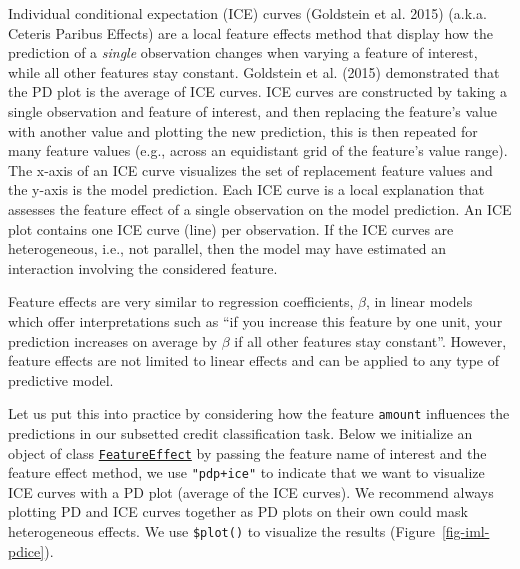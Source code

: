 Individual conditional
expectation (ICE) curves (Goldstein et
al. 2015) (a.k.a. Ceteris Paribus
Effects)
are a local feature effects method that display how the prediction of a
\emph{single} observation changes when varying a feature of interest,
while all other features stay constant. Goldstein et al. (2015)
demonstrated that the PD plot is the average of ICE curves. ICE curves
are constructed by taking a single observation and feature of interest,
and then replacing the feature's value with another value and plotting
the new prediction, this is then repeated for many feature values (e.g.,
across an equidistant grid of the feature's value range). The x-axis of
an ICE curve visualizes the set of replacement feature values and the
y-axis is the model prediction. Each ICE curve is a local explanation
that assesses the feature effect of a single observation on the model
prediction. An ICE plot contains one ICE curve (line) per observation.
If the ICE curves are heterogeneous, i.e., not parallel, then the model
may have estimated an interaction involving the considered feature.

\begin{tcolorbox}[enhanced jigsaw, opacitybacktitle=0.6, rightrule=.15mm, opacityback=0, arc=.35mm, breakable, titlerule=0mm, colframe=quarto-callout-tip-color-frame, coltitle=black, bottomrule=.15mm, toprule=.15mm, colback=white, colbacktitle=quarto-callout-tip-color!10!white, bottomtitle=1mm, toptitle=1mm, title=\textcolor{quarto-callout-tip-color}{\faLightbulb}\hspace{0.5em}{Feature Effects Can Be Non-Linear}, leftrule=.75mm, left=2mm]

Feature effects are very similar to regression coefficients, \(\beta\),
in linear models which offer interpretations such as ``if you increase
this feature by one unit, your prediction increases on average by
\(\beta\) if all other features stay constant''. However, feature
effects are not limited to linear effects and can be applied to any type
of predictive model.

\end{tcolorbox}

Let us put this into practice by considering how the feature
\texttt{amount} influences the predictions in our subsetted credit
classification task. Below we initialize an object of class
\href{https://www.rdocumentation.org/packages/iml/topics/FeatureEffect}{\texttt{FeatureEffect}}
by passing the feature name of interest and the feature effect method,
we use \texttt{"pdp+ice"} to indicate that we want to visualize ICE
curves with a PD plot (average of the ICE curves). We recommend always
plotting PD and ICE curves together as PD plots on their own could mask
heterogeneous effects. We use \texttt{\$plot()} to visualize the results
(Figure~\ref{fig-iml-pdice}).

